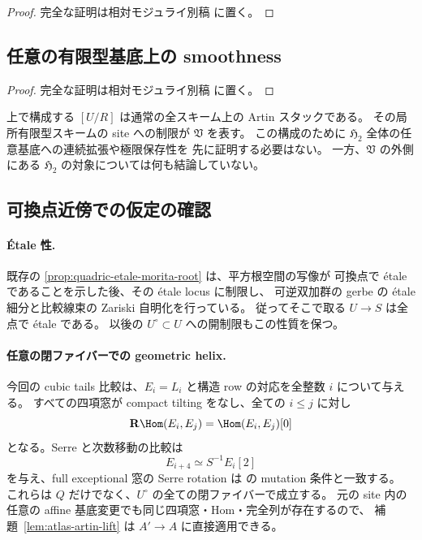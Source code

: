 \begin{proof}
完全な証明は相対モジュライ別稿 \cite[効果的foundationの滑らかな局所atlas]{QuadricModuli2026} に置く。
\end{proof}

\subsection{任意の有限型基底上の smoothness}

\begin{proof}
完全な証明は相対モジュライ別稿 \cite[効果的foundationの滑らかな局所atlas]{QuadricModuli2026} に置く。
\end{proof}

\begin{remark}
上で構成する $[U/R]$ は通常の全スキーム上の Artin スタックである。
その局所有限型スキームの site への制限が $\mathfrak V$ を表す。
この構成のために $\mathfrak H_2$ 全体の任意基底への連続拡張や極限保存性を
先に証明する必要はない。
一方、$\mathfrak V$ の外側にある $\mathfrak H_2$ の対象については何も結論していない。
\end{remark}

\subsection{可換点近傍での仮定の確認}

\paragraph{\'Etale 性.}
既存の \ref{prop:quadric-etale-morita-root} は、平方根空間の写像が
可換点で \'etale であることを示した後、その \'etale locus に制限し、
可逆双加群の gerbe の \'etale 細分と比較線束の Zariski 自明化を行っている。
従ってそこで取る $U\to S$ は全点で \'etale である。
以後の $U^\circ\subset U$ への開制限もこの性質を保つ。

\paragraph{任意の閉ファイバーでの geometric helix.}
今回の cubic tails 比較は、$E_i=L_i$ と構造 row の対応を全整数 $i$ について与える。
すべての四項窓が compact tilting をなし、全ての $i\leq j$ に対し
\[
 \mathbf R\Hom(E_i,E_j)=\Hom(E_i,E_j)[0]
\]
となる。Serre と次数移動の比較は
\[
 E_{i+4}\simeq S^{-1}E_i[2]
\]
を与え、full exceptional 窓の Serre rotation は
\cite[Definition 5.12]{DeDekenLowen2011} の mutation 条件と一致する。
これらは $Q$ だけでなく、$U^\circ$ の全ての閉ファイバーで成立する。
元の site 内の任意の affine 基底変更でも同じ四項窓・Hom・完全列が存在するので、
補題~\ref{lem:atlas-artin-lift} は $A'\to A$ に直接適用できる。

